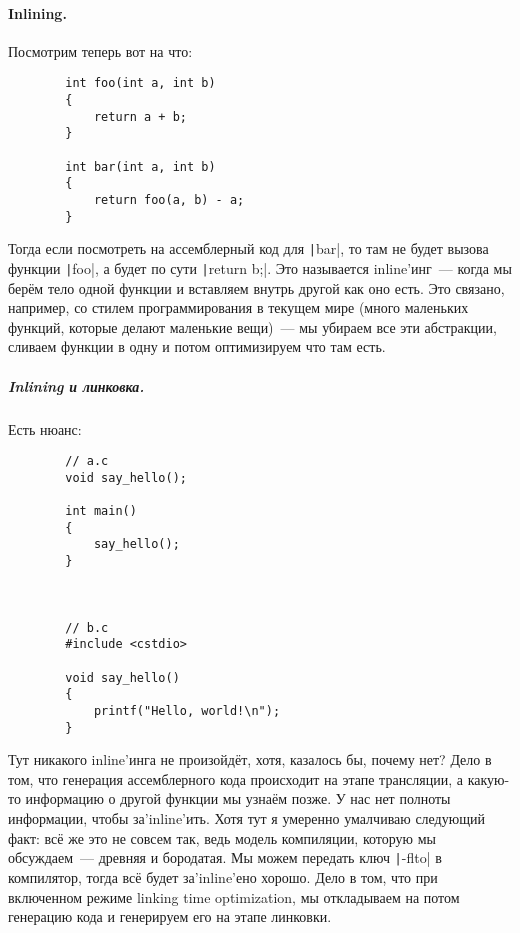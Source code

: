 \documentclass{article}
\begin{document}
    \paragraph{Inlining.}
    Посмотрим теперь вот на что:
    \begin{verbatim}
        int foo(int a, int b)
        {
            return a + b;
        }

        int bar(int a, int b)
        {
            return foo(a, b) - a;
        }
    \end{verbatim}
    Тогда если посмотреть на ассемблерный код для \texttt|bar|, то там не будет вызова функции \texttt|foo|, а будет по сути \texttt|return b;|. Это называется inline'инг~--- когда мы берём тело одной функции и вставляем внутрь другой как оно есть. Это связано, например, со стилем программирования в текущем мире (много маленьких функций, которые делают маленькие вещи)~--- мы убираем все эти абстракции, сливаем функции в одну и потом оптимизируем что там есть.
    \subparagraph{Inlining и линковка.}
    Есть нюанс:
    \begin{verbatim}
        // a.c
        void say_hello();

        int main()
        {
            say_hello();
        }



        // b.c
        #include <cstdio>

        void say_hello()
        {
            printf("Hello, world!\n");
        }
    \end{verbatim}
    Тут никакого inline'инга не произойдёт, хотя, казалось бы, почему нет? Дело в том, что генерация ассемблерного кода происходит на этапе трансляции, а какую-то информацию о другой функции мы узнаём позже. У нас нет полноты информации, чтобы за'inline'ить. Хотя тут я умеренно умалчиваю следующий факт: всё же это не совсем так, ведь модель компиляции, которую мы обсуждаем~--- древняя и бородатая. Мы можем передать ключ \texttt|-flto| в компилятор, тогда всё будет за'inline'ено хорошо. Дело в том, что при включенном режиме linking time optimization, мы откладываем на потом генерацию кода и генерируем его на этапе линковки.
\end{document}
